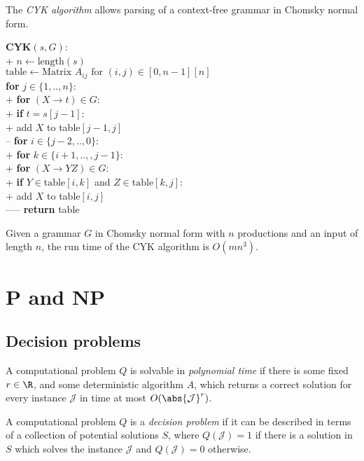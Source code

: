 \documentclass{article}
\begin{document}
\begin{definition}
	The \emph{CYK algorithm} allows parsing of a context-free
	grammar in Chomsky normal form.
	\begin{pseudo}
		\textbf{CYK}$(s,G)$:\\+
			$n\leftarrow\text{length}(s)$\\
			$\text{table}\leftarrow\text{Matrix }A_{ij}\text{ for }(i,j)\in[0,n-1][n]$\\
			\textbf{for} $j\in\{1,..,n\}$:\\+
				\textbf{for} $(X\to t)\in G$:\\+
					\textbf{if} $t=s[j-1]$:\\+
						add $X$ to table$[j-1,j]$\\--
				\textbf{for} $i\in\{j-2,..,0\}$:\\+
					\textbf{for} $k\in\{i+1,..,,j-1\}$:\\+
						\textbf{for} $(X\to YZ)\in G$:\\+
							\textbf{if} $Y\in\text{table}[i,k]$ and $Z\in\text{table}[k,j]$:\\+
								add $X$ to table$[i,j]$\\-----
            \textbf{return} table
    \end{pseudo}
\end{definition}

\begin{theorem}
	Given a grammar $G$ in Chomsky normal form with $n$ 
	productions and an input of length $n$, the run time
	of the CYK algorithm is $O(mn^3)$.
\end{theorem}

\section{P and NP}

\subsection{Decision problems}

\begin{definition}
	A computational problem $Q$ is solvable in \emph{polynomial
	time} if there is some fixed $r\in\R$, and some deterministic
	algorithm $A$, which returns a correct solution for every
	instance $\mathcal{J}$ in time at most $O(\abs{\mathcal{J}}^r)$.
\end{definition}

\begin{definition}
	A computational problem $Q$ is a \emph{decision problem} if
	it can be described in terms of a collection of potential
	solutions $S$, where $Q(\mathcal{J})=1$ if there is a solution
	in $S$ which solves the instance $\mathcal{J}$ and $Q(\mathcal{J})=0$
	otherwise.
\end{definition}
\end{document}
